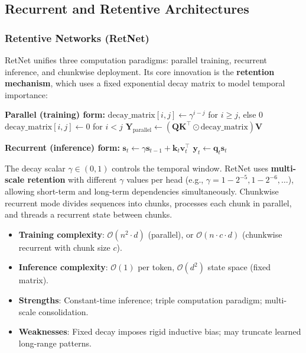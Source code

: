 \subsection{Recurrent and Retentive Architectures}

\subsubsection{Retentive Networks (RetNet)}
RetNet \citep{sun_retentive_2023} unifies three computation paradigms: parallel training, recurrent inference, and chunkwise deployment. Its core innovation is the \textbf{retention mechanism}, which uses a fixed exponential decay matrix to model temporal importance:

\begin{algorithmic}[1]
\State \textbf{Parallel (training) form:}
\State $\text{decay\_matrix}[i,j] \gets \gamma^{i-j}$ for $i \geq j$, else $0$ 
\State $\text{decay\_matrix}[i,j] \gets 0$ for $i < j$ 
\State $\mathbf{Y}_{\text{parallel}} \gets (\mathbf{Q}\mathbf{K}^\top \odot \text{decay\_matrix}) \mathbf{V}$ 
\end{algorithmic}

\begin{algorithmic}[1]
\State \textbf{Recurrent (inference) form:}
    \State $\mathbf{s}_t \gets \gamma \mathbf{s}_{t-1} + \mathbf{k}_t \mathbf{v}_t^\top$ 
    \State $\mathbf{y}_t \gets \mathbf{q}_t \mathbf{s}_t$ 
\EndFor
\end{algorithmic}

The decay scalar $\gamma \in (0,1)$ controls the temporal window. RetNet uses \textbf{multi-scale retention} with different $\gamma$ values per head (e.g., $\gamma = 1 - 2^{-5}, 1 - 2^{-6}, \ldots$), allowing short-term and long-term dependencies simultaneously. Chunkwise recurrent mode divides sequences into chunks, processes each chunk in parallel, and threads a recurrent state between chunks.

\begin{itemize}[leftmargin=*]
    \item \textbf{Training complexity}: $\mathcal{O}(n^2 \cdot d)$ (parallel), or $\mathcal{O}(n \cdot c \cdot d)$ (chunkwise recurrent with chunk size $c$).
    \item \textbf{Inference complexity}: $\mathcal{O}(1)$ per token, $\mathcal{O}(d^2)$ state space (fixed matrix).
    \item \textbf{Strengths}: Constant-time inference; triple computation paradigm; multi-scale consolidation.
    \item \textbf{Weaknesses}: Fixed decay imposes rigid inductive bias; may truncate learned long-range patterns.
\end{itemize}

